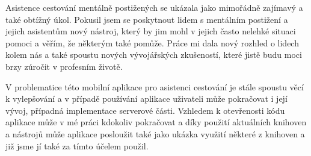 \documentclass[czech,master,public,dept460,male,java,cpdeclaration]{diploma}
\begin{document}
Asistence cestování mentálně postižených se ukázala jako mimořádně zajímavý a také obtížný úkol.
Pokusil jsem se poskytnout lidem s mentálním postižení a jejich asistentům nový nástroj, který by
jim mohl v jejich často nelehké situaci pomoci a věřím, že některým také pomůže. Práce mi dala
nový rozhled o lidech kolem nás a také spoustu nových vývojářských zkušeností, které
jistě budu moci brzy zúročit v profesním životě.

V problematice této mobilní aplikace pro asistenci cestování je stále spoustu věcí k vylepšování
a v případě používání aplikace uživateli může pokračovat i její vývoj, případná implementace serverové části.
Vzhledem k otevřenosti kódu aplikace může v mé práci kdokoliv pokračovat a díky použití
aktuálních knihoven a nástrojů může aplikace posloužit také jako ukázka využití některé z knihoven
a již jsme jí také za tímto účelem použil.
\end{document}
